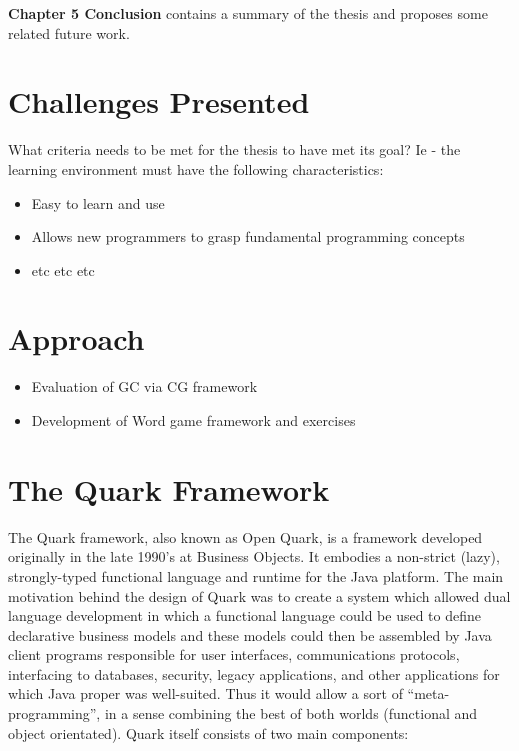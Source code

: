
\textbf{Chapter 5 Conclusion} contains a summary of the thesis and proposes some related future work.

\section{Challenges Presented}

What criteria needs to be met for the thesis to have met its goal?  Ie - the learning environment must have the following characteristics:

\begin{itemize}
	\item Easy to learn and use
	\item Allows new programmers to grasp fundamental programming concepts
	\item etc etc etc
\end{itemize}

\section{Approach}

\begin{itemize}
	\item Evaluation of GC via CG framework
	\item Development of Word game framework and exercises
\end{itemize}

\section{The Quark Framework}

The Quark framework, also known as Open Quark, is a framework developed originally in the late 1990's at Business Objects.
It embodies a non-strict (lazy), strongly-typed functional language and runtime for the Java platform.  The main motivation behind the design of Quark was to create a system which allowed dual language development in which a functional language could be used to define declarative business models and these models could then be assembled by Java client programs responsible for user interfaces, communications protocols, interfacing to databases, security, legacy applications, and other applications for which Java proper was well-suited.  Thus it would allow a sort of ``meta-programming'', in a sense combining the best of both worlds (functional and object orientated).\cite{evans07}  Quark itself consists of two main components:

